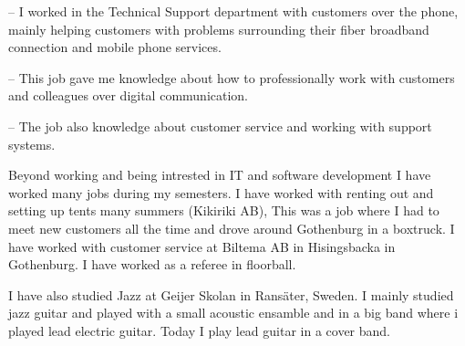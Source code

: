 \documentclass[color=NavyBlue]{devResume}
\begin{document}
{            
                {
                    \item[--] I worked in the Technical Support department with customers over the phone, mainly helping customers with problems surrounding their fiber broadband connection and mobile phone services.
                    \item[--] This job gave me knowledge about how to professionally work with customers and colleagues over digital communication.
                    \item[--] The job also knowledge about customer service and working with support systems.
                }

            Beyond working and being intrested in IT and software development I have worked many jobs during my semesters.
            I have worked with renting out and setting up tents many summers (Kikiriki AB), This was a job where I had to meet new customers all the time and drove around Gothenburg in a boxtruck.
            I have worked with customer service at Biltema AB in Hisingsbacka in Gothenburg.
            I have worked as a referee in floorball.

            \smallskip
            I have also studied Jazz at Geijer Skolan in Ransäter, Sweden. I mainly studied jazz guitar and played with a small acoustic ensamble and in a big band where i played lead electric guitar. Today I play lead guitar in a cover band.

    }
\end{document}
